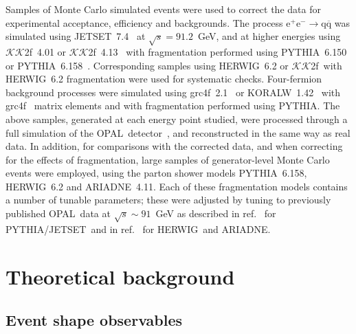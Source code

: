 \documentclass[12pt,a4paper,twoside]{article}
\newcommand{\qqbar}  {\ensuremath{\mathrm{q\overline{q}}}}
\newcommand{\epem}   {\ensuremath{\mathrm{e^+e^-}}}
\newcommand{\Opal}{\mbox{\rm OPAL}}
\newcommand{\Herwig}{\mbox{HERWIG}}
\newcommand{\Pythia}{\mbox{PYTHIA}}
\newcommand{\Jetset}{\mbox{JETSET}}
\newcommand{\Koralw}{\mbox{KORALW}}
\newcommand{\kkff}{\mbox{$\mathcal{KK}$2f}}
\newcommand{\Ariadne}{\mbox{ARIADNE}}
\newcommand{\grcff}{\mbox{grc4f}}
\begin{document}
Samples of Monte Carlo simulated events were used to
correct the data for experimental acceptance, efficiency and backgrounds.
The process $\epem\rightarrow\qqbar$ was simulated using
\Jetset~7.4~\cite{jetset3} at $\sqrt{s}=91.2$~GeV, and at higher energies
using \kkff~4.01 or \kkff~4.13~\cite{kk2f} with 
fragmentation performed using \Pythia~6.150 or \Pythia~6.158~\cite{jetset3}.
Corresponding samples using \Herwig~6.2\cite{herwig} or 
\kkff\ with  \Herwig~6.2 fragmentation were used for systematic checks.  
Four-fermion background processes were
simulated using \grcff~2.1~\cite{grc4f} or \Koralw~1.42~\cite{koralw} 
with \grcff~\cite{grc4f} matrix elements and with 
 fragmentation performed using 
\Pythia.  The above samples, generated at each energy point studied, 
were processed through a full simulation of the 
\Opal\ detector~\cite{gopal}, and 
reconstructed in the same way as real data.
In addition, for comparisons with the corrected data, and when 
correcting for the effects of fragmentation, large samples
of generator-level Monte Carlo events were employed, using the
parton shower 
models \Pythia~6.158, \Herwig~6.2 and 
\Ariadne~4.11\cite{ariadne3}.
Each of these fragmentation 
models contains a number of tunable parameters; 
these were adjusted by tuning to previously published \Opal\ data at 
$\sqrt{s}\sim91$~GeV as described in ref.~\cite{OPALPR141} for 
\Pythia/\Jetset\ and in ref.~\cite{OPALPR379} for \Herwig\ and \Ariadne.

\section{ Theoretical background}
\label{sec_theo}
\subsection{Event shape observables}
\label{sec_evshapedef}
\end{document}
